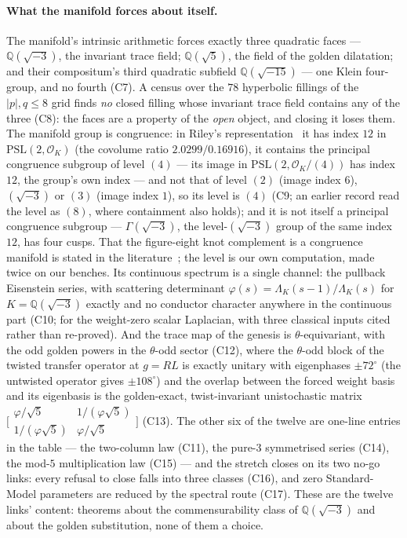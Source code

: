 \documentclass[11pt,a4paper]{article}
\theoremstyle{definition}
\theoremstyle{remark}
\newcommand{\Q}{\mathbb{Q}}
\begin{document}
\paragraph{What the manifold forces about itself.} The manifold's intrinsic arithmetic forces exactly three quadratic
faces --- $\Q(\sqrt{-3})$, the invariant trace field; $\Q(\sqrt5)$, the field of the golden dilatation; and their compositum's
third quadratic subfield $\Q(\sqrt{-15})$ --- one Klein four-group, and no fourth (C7). A census over the $78$ hyperbolic
fillings of the $|p|,q \le 8$ grid finds \emph{no} closed filling whose invariant trace field contains any of the three
(C8): the faces are a property of the \emph{open} object, and closing it loses them. The manifold group is congruence: in Riley's
representation~\cite{riley} it has index $12$ in $\mathrm{PSL}(2,\mathcal O_K)$ (the covolume ratio $2.0299/0.16916$), it contains
the principal congruence subgroup of level $(4)$ --- its image in $\mathrm{PSL}(2,\mathcal O_K/(4))$ has index $12$, the group's own
index --- and not that of level $(2)$ (image index $6$), $(\sqrt{-3})$ or $(3)$ (image index $1$), so its level is $(4)$ (C9; an earlier
record read the level as $(8)$, where containment also holds); and it is not itself a
principal congruence subgroup --- $\Gamma(\sqrt{-3})$, the level-$(\sqrt{-3})$ group of the same index $12$, has four cusps. That the
figure-eight knot complement is a congruence manifold is stated in the literature~\cite{bakerreid}; the level is our own
computation, made twice on our benches. Its continuous spectrum
is a single channel: the pullback Eisenstein series, with scattering determinant $\varphi(s) = \Lambda_K(s-1)/\Lambda_K(s)$ for
$K = \Q(\sqrt{-3})$ exactly and no conductor character anywhere in the continuous part (C10; for the weight-zero scalar
Laplacian, with three classical inputs cited rather than re-proved). And the trace map of the
genesis is $\theta$-equivariant, with the odd golden powers in the $\theta$-odd sector (C12), where the $\theta$-odd block of
the twisted transfer operator at $g = RL$ is exactly unitary with eigenphases $\pm 72^\circ$ (the untwisted operator gives
$\pm 108^\circ$) and the overlap between the forced weight basis and
its eigenbasis is the golden-exact, twist-invariant unistochastic matrix
$\bigl[\begin{smallmatrix}\varphi/\sqrt5 & 1/(\varphi\sqrt5)\\ 1/(\varphi\sqrt5) & \varphi/\sqrt5\end{smallmatrix}\bigr]$
(C13). The other six of the twelve are one-line entries in the table --- the two-column law (C11), the pure-$3$ symmetrised
series (C14), the mod-$5$ multiplication law (C15) --- and the stretch closes on its two no-go links: every refusal to close
falls into three classes (C16), and zero Standard-Model parameters are reduced by the spectral route (C17). These are the
twelve links' content: theorems about the commensurability class of $\Q(\sqrt{-3})$ and about the golden substitution, none
of them a choice.
\end{document}
